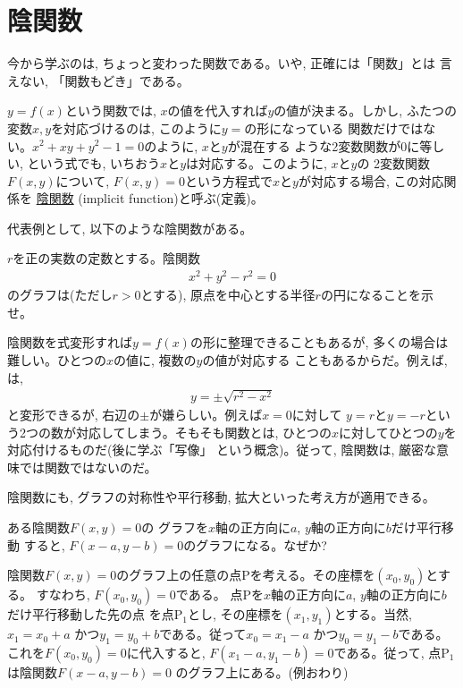 \section{陰関数}

今から学ぶのは, ちょっと変わった関数である。いや, 正確には「関数」とは
言えない, 「関数もどき」である。

$y=f(x)$という関数では, $x$の値を代入すれば$y$の値が決まる。しかし, 
ふたつの変数$x, y$を対応づけるのは, このように$y=$の形になっている
関数だけではない。$x^2+xy+y^2-1=0$のように, $x$と$y$が混在する
ような2変数関数が0に等しい, という式でも, いちおう$x$と$y$は対応する。このように, $x$と$y$の
2変数関数$F(x, y)$について, $F(x, y)=0$という方程式で$x$と$y$が対応する場合, この対応関係を
\underline{陰関数} (implicit function)と呼ぶ(定義)。

代表例として, 以下のような陰関数がある。

\begin{q}\label{q:func_circle0} $r$を正の実数の定数とする。陰関数
\begin{eqnarray}
x^2+y^2-r^2=0\label{eq:func_circle0}
\end{eqnarray}
のグラフは(ただし$r>0$とする), 原点を中心とする半径$r$の円になることを示せ。\end{q}
\mv

陰関数を式変形すれば$y=f(x)$の形に整理できることもあるが, 
多くの場合は難しい。ひとつの$x$の値に, 複数の$y$の値が対応する
こともあるからだ。例えば, は, 
\begin{eqnarray}
y=\pm\sqrt{r^2-x^2}\label{eq:func_circle00}
\end{eqnarray}
と変形できるが, 右辺の$\pm$が嫌らしい。例えば$x=0$に対して
$y=r$と$y=-r$という2つの数が対応してしまう。そもそも関数とは, 
ひとつの$x$に対してひとつの$y$を対応付けるものだ(後に学ぶ「写像」
という概念)。従って, 陰関数は, 厳密な意味では関数ではないのだ。\hv

陰関数にも, グラフの対称性や平行移動, 拡大といった考え方が適用できる。

\begin{exmpl}\label{ex:func_imp0} ある陰関数$F(x,y)=0$の
グラフを$x$軸の正方向に$a$, $y$軸の正方向に$b$だけ平行移動
すると, $F(x-a, y-b)=0$のグラフになる。なぜか?

陰関数$F(x,y)=0$のグラフ上の任意の点Pを考える。その座標を$(x_0, y_0)$とする。
すなわち, $F(x_0, y_0)=0$である。
点Pを$x$軸の正方向に$a$, $y$軸の正方向に$b$だけ平行移動した先の点
を点P$_1$とし, その座標を$(x_1, y_1)$とする。当然, $x_1=x_0+a$
かつ$y_1=y_0+b$である。従って$x_0=x_1-a$
かつ$y_0=y_1-b$である。これを$F(x_0, y_0)=0$に代入すると, 
$F(x_1-a, y_1-b)=0$である。従って, 点P$_1$は陰関数$F(x-a, y-b)=0$
のグラフ上にある。(例おわり)\end{exmpl}

